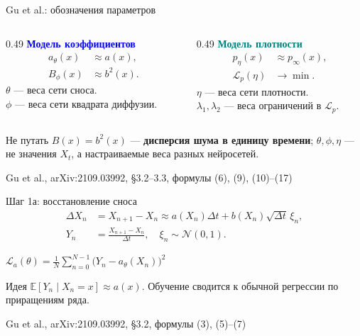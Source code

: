 \documentclass[10pt,aspectratio=169]{beamer}
\newcommand{\src}[1]{\vfill{\tiny\color{graytext}Gu et al., arXiv:2109.03992, #1}}
\begin{document}
\begin{frame}{Gu et al.: обозначения параметров}
\vspace{0.10cm}
\begin{columns}[T,onlytextwidth]
\begin{column}{0.49\textwidth}
\textcolor{blue}{\bfseries Модель коэффициентов}
\begin{align*}
 a_\theta(x)&\approx a(x),\\
 B_\phi(x)&\approx b^2(x).
\end{align*}
$\theta$ --- веса сети сноса.\\[0.13cm]
$\phi$ --- веса сети квадрата диффузии.
\end{column}
\begin{column}{0.49\textwidth}
\textcolor{teal}{\bfseries Модель плотности}
\begin{align*}
 p_\eta(x)&\approx p_\infty(x),\\
 \mathcal L_p(\eta)&\longrightarrow\min.
\end{align*}
$\eta$ --- веса сети плотности.\\[0.13cm]
$\lambda_1,\lambda_2$ --- веса ограничений в $\mathcal L_p$.
\end{column}
\end{columns}
\vspace{0.25cm}
\begin{block}{Не путать}
$B(x)=b^2(x)$ --- \textbf{дисперсия шума в единицу времени};
$\theta,\phi,\eta$ --- не значения $X_t$, а настраиваемые веса разных нейросетей.
\end{block}
\src{\S 3.2--3.3, формулы (6), (9), (10)--(17)}
\end{frame}

\begin{frame}{Шаг 1а: восстановление сноса}
\vspace{0.11cm}
\begin{align*}
\Delta X_n&=X_{n+1}-X_n\approx a(X_n)\Delta t+b(X_n)\sqrt{\Delta t}\,\xi_n,\\
Y_n&=\frac{X_{n+1}-X_n}{\Delta t},\quad \xi_n\sim\mathcal N(0,1).
\end{align*}
\vspace{0.03cm}
\begin{center}
\large $\displaystyle\boxed{\mathcal L_a(\theta)=\frac1N\sum_{n=0}^{N-1}\bigl(Y_n-a_\theta(X_n)\bigr)^2}$
\end{center}
\vspace{0.17cm}
\begin{block}{Идея}
$\mathbb E[Y_n\mid X_n=x]\approx a(x)$. Обучение сводится к обычной регрессии по приращениям ряда.
\end{block}
\src{\S 3.2, формулы (3), (5)--(7)}
\end{frame}
\end{document}

